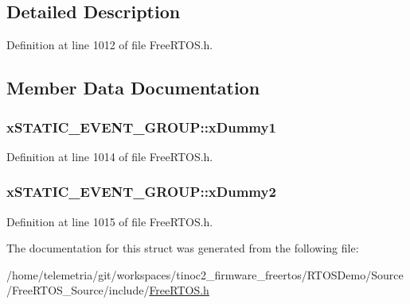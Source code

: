 \subsection{Detailed Description}


Definition at line 1012 of file Free\+R\+T\+O\+S.\+h.



\subsection{Member Data Documentation}
\subsubsection[{\texorpdfstring{x\+Dummy1}{xDummy1}}]{ x\+S\+T\+A\+T\+I\+C\+\_\+\+E\+V\+E\+N\+T\+\_\+\+G\+R\+O\+U\+P\+::x\+Dummy1}\hypertarget{structx_s_t_a_t_i_c___e_v_e_n_t___g_r_o_u_p_a4ed0094f715dd8f79a354f42fd973fc6}{}\label{structx_s_t_a_t_i_c___e_v_e_n_t___g_r_o_u_p_a4ed0094f715dd8f79a354f42fd973fc6}


Definition at line 1014 of file Free\+R\+T\+O\+S.\+h.

\subsubsection[{\texorpdfstring{x\+Dummy2}{xDummy2}}]{ x\+S\+T\+A\+T\+I\+C\+\_\+\+E\+V\+E\+N\+T\+\_\+\+G\+R\+O\+U\+P\+::x\+Dummy2}\hypertarget{structx_s_t_a_t_i_c___e_v_e_n_t___g_r_o_u_p_a17d070c972ecd0151d7505a539653551}{}\label{structx_s_t_a_t_i_c___e_v_e_n_t___g_r_o_u_p_a17d070c972ecd0151d7505a539653551}


Definition at line 1015 of file Free\+R\+T\+O\+S.\+h.



The documentation for this struct was generated from the following file\+:\begin{DoxyCompactItemize}
\item 
/home/telemetria/git/workspaces/tinoc2\+\_\+firmware\+\_\+freertos/\+R\+T\+O\+S\+Demo/\+Source/\+Free\+R\+T\+O\+S\+\_\+\+Source/include/\hyperlink{_free_r_t_o_s_8h}{Free\+R\+T\+O\+S.\+h}\end{DoxyCompactItemize}
